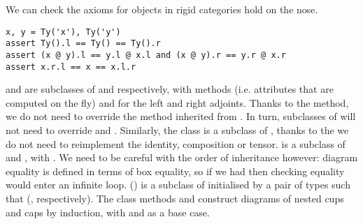 \begin{example}
We can check the axioms for objects in rigid categories hold on the nose.

\begin{verbatim}
x, y = Ty('x'), Ty('y')
assert Ty().l == Ty() == Ty().r
assert (x @ y).l == y.l @ x.l and (x @ y).r == y.r @ x.r
assert x.r.l == x == x.l.r
\end{verbatim}
\end{example}

 and  are subclasses of  and  respectively, with  methods (i.e. attributes that are computed on the fly)  and  for the left and right adjoints.
Thanks to the  method, we do not need to override the  method inherited from .
In turn, subclasses of  will not need to override  and .
Similarly, the  class is a subclass of , thanks to the  we do not need to reimplement the identity, composition or tensor.
 is a subclass of  and , with .
We need to be careful with the order of inheritance however: diagram equality is defined in terms of box equality, so if we had  then checking equality would enter an infinite loop.
 () is a subclass of  initialised by a pair of types  such that   (, respectively).
The class methods  and  construct diagrams of nested cups and caps by induction, with  and  as a base case.

